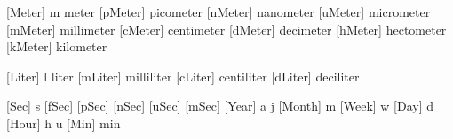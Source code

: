
\def\Times   {\dimensionnopfix{\iftextdimensions.\else\cdot\fi}}
\def\Solidus {\dimensionmidfix{/}}
\def\Per     {\dimensionmidfix{/}}
\def\OutOf   {\dimensionnopfix{:}}


\def\Linear  {\dimensionpower{1}}
\def\Square  {\dimensionpower{2}}
\def\Cubic   {\dimensionpower{3}}

\def\Inverse {\dimensionpower{-1}}
\def\ILinear {\dimensionpower{-1}}
\def\ISquare {\dimensionpower{-2}}
\def\ICubic  {\dimensionpower{-3}}


 [Meter]  {m}             {meter}
 [pMeter] {\Pico  \Meter} {picometer}
 [nMeter] {\Nano  \Meter} {nanometer}
 [uMeter] {\Micro \Meter} {micrometer}
 [mMeter] {\Milli \Meter} {millimeter}
 [cMeter] {\Centi \Meter} {centimeter}
 [dMeter] {\Deci  \Meter} {decimeter}
 [hMeter] {\Hecto \Meter} {hectometer}
 [kMeter] {\Kilo  \Meter} {kilometer}


 [Liter]  {l}             {liter}
 [mLiter] {\Milli \Liter} {milliliter}
 [cLiter] {\Centi \Liter} {centiliter}
 [dLiter] {\Deci  \Liter} {deciliter}


 [Sec]   {s}                       {}
 [fSec]  {\Femto \Sec}             {}
 [pSec]  {\Pico \Sec}              {}
 [nSec]  {\Nano \Sec}              {}
 [uSec]  {\Micro \Sec}             {}
 [mSec]  {\Milli \Sec}             {}
 [Year]  {\ifSIunits a \else j\fi} {}
 [Month] {m}                       {}
 [Week]  {w}                       {}
 [Day]   {d}                       {}
 [Hour]  {\ifSIunits h \else u\fi} {}
 [Min]   {min}                     {}

